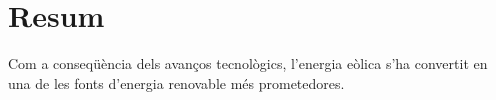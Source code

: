 \chapter*{Resum}
Com a conseq\"{u}\`encia dels avan\c{c}os tecnol\`ogics, l'energia e\`olica s'ha convertit en una de les fonts d'energia renovable m\'es prometedores. 